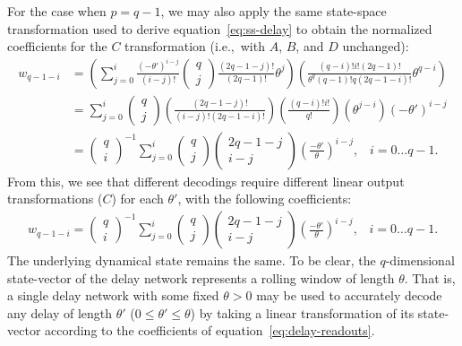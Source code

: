 For the case when $p = q - 1$, we may also apply the same state-space transformation used to derive equation~\ref{eq:ss-delay} to obtain the normalized coefficients for the $C$ transformation (i.e.,~with $A$, $B$, and $D$ unchanged):
\begin{align*}
w_{q-1-i} &= \left( \sum_{j=0}^i \frac{(-\theta')^{i-j}}{(i - j)!} \begin{pmatrix}q \\ j\end{pmatrix} \frac{(2q - 1 - j)!}{(2q - 1)!} \theta^j \right) \left( \frac{(q - i)! i! (2q - 1)!}{\theta^q (q - 1)! q(2q - 1 - i)!} \theta^{q - i} \right) \\
&= \sum_{j=0}^i \begin{pmatrix}q \\ j\end{pmatrix} \left( \frac{(2q - 1 - j)!}{(i - j)! (2q - 1 - i)!} \right) \left( \frac{(q - i)! i!}{q!} \right) \left( \theta^{j - i} \right) (-\theta')^{i - j} \\
&= \begin{pmatrix}q \\ i\end{pmatrix}^{-1} \sum_{j=0}^i \begin{pmatrix}q \\ j\end{pmatrix} \begin{pmatrix}2q - 1 - j \\ i - j\end{pmatrix} \left( \frac{-\theta'}{\theta} \right)^{i - j} \text{,} \quad i = 0 \ldots q - 1 \text{.}
\end{align*}
From this, we see that different decodings require different linear output transformations ($C$) for each $\theta'$, with the following coefficients:
\begin{align} \label{eq:delay-readouts}
w_{q-1-i} = \begin{pmatrix}q \\ i\end{pmatrix}^{-1} \sum_{j=0}^i \begin{pmatrix}q \\ j\end{pmatrix} \begin{pmatrix}2q - 1 - j \\ i - j\end{pmatrix} \left( \frac{-\theta'}{\theta} \right)^{i - j} \text{,} \quad i = 0 \ldots q - 1 \text{.} 
\end{align}
The underlying dynamical state remains the same.
To be clear, the $q$-dimensional state-vector of the delay network represents a rolling window of length $\theta$.
That is, a single delay network with some fixed $\theta > 0$ may be used to accurately decode any delay of length $\theta'$ ($0 \le \theta' \le \theta$) by taking a linear transformation of its state-vector according to the coefficients of equation~\ref{eq:delay-readouts}.

